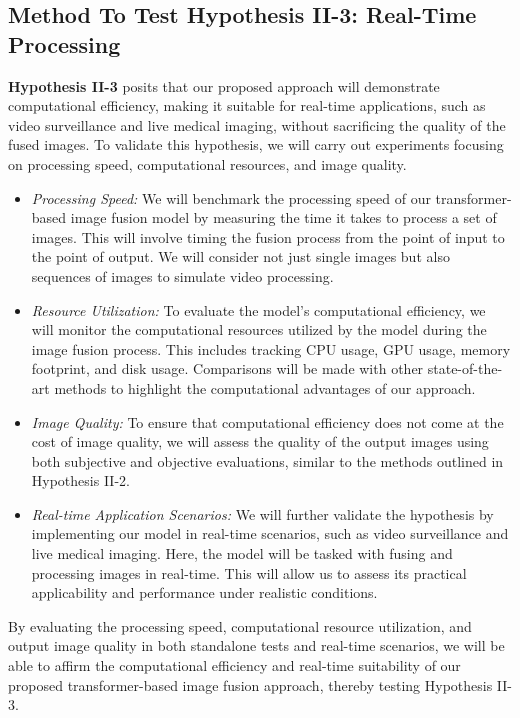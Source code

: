 \subsection{Method To Test Hypothesis II-3: Real-Time Processing} \label{subsec:met7}

\textbf{Hypothesis II-3} posits that our proposed approach will demonstrate computational efficiency, making it suitable for real-time applications, such as video surveillance and live medical imaging, without sacrificing the quality of the fused images. To validate this hypothesis, we will carry out experiments focusing on processing speed, computational resources, and image quality.

\begin{itemize}
    \item \textit{Processing Speed:} We will benchmark the processing speed of our transformer-based image fusion model by measuring the time it takes to process a set of images. This will involve timing the fusion process from the point of input to the point of output. We will consider not just single images but also sequences of images to simulate video processing.

    \item \textit{Resource Utilization:} To evaluate the model's computational efficiency, we will monitor the computational resources utilized by the model during the image fusion process. This includes tracking CPU usage, GPU usage, memory footprint, and disk usage. Comparisons will be made with other state-of-the-art methods to highlight the computational advantages of our approach.

    \item \textit{Image Quality:} To ensure that computational efficiency does not come at the cost of image quality, we will assess the quality of the output images using both subjective and objective evaluations, similar to the methods outlined in Hypothesis II-2.

    \item \textit{Real-time Application Scenarios:} We will further validate the hypothesis by implementing our model in real-time scenarios, such as video surveillance and live medical imaging. Here, the model will be tasked with fusing and processing images in real-time. This will allow us to assess its practical applicability and performance under realistic conditions.

\end{itemize}

By evaluating the processing speed, computational resource utilization, and output image quality in both standalone tests and real-time scenarios, we will be able to affirm the computational efficiency and real-time suitability of our proposed transformer-based image fusion approach, thereby testing Hypothesis II-3.

